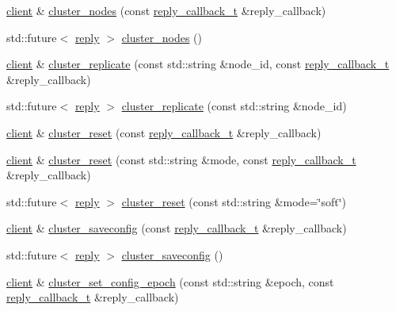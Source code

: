 \begin{DoxyCompactItemize}
\hyperlink{classcpp__redis_1_1client}{client} \& \hyperlink{classcpp__redis_1_1client_a1e4cc880ce249fcad1b1f6ddd15f515f}{cluster\+\_\+nodes} (const \hyperlink{classcpp__redis_1_1client_a061a1140d36d2eaeda82b09a0bb3f9f2}{reply\+\_\+callback\+\_\+t} \&reply\+\_\+callback)
\item 
std\+::future$<$ \hyperlink{classcpp__redis_1_1reply}{reply} $>$ \hyperlink{classcpp__redis_1_1client_a6e777dc7b54ecb4aff3e1c281f92dd81}{cluster\+\_\+nodes} ()
\item 
\hyperlink{classcpp__redis_1_1client}{client} \& \hyperlink{classcpp__redis_1_1client_a65688223390e47c0400ba4a128000f89}{cluster\+\_\+replicate} (const std\+::string \&node\+\_\+id, const \hyperlink{classcpp__redis_1_1client_a061a1140d36d2eaeda82b09a0bb3f9f2}{reply\+\_\+callback\+\_\+t} \&reply\+\_\+callback)
\item 
std\+::future$<$ \hyperlink{classcpp__redis_1_1reply}{reply} $>$ \hyperlink{classcpp__redis_1_1client_a4ce5b739522aefd5ca7c8aef8c76cc61}{cluster\+\_\+replicate} (const std\+::string \&node\+\_\+id)
\item 
\hyperlink{classcpp__redis_1_1client}{client} \& \hyperlink{classcpp__redis_1_1client_a99c86f1931c92594f2c14ac34b3d5dfd}{cluster\+\_\+reset} (const \hyperlink{classcpp__redis_1_1client_a061a1140d36d2eaeda82b09a0bb3f9f2}{reply\+\_\+callback\+\_\+t} \&reply\+\_\+callback)
\item 
\hyperlink{classcpp__redis_1_1client}{client} \& \hyperlink{classcpp__redis_1_1client_a3f039634232d14d4eec6fea27784a347}{cluster\+\_\+reset} (const std\+::string \&mode, const \hyperlink{classcpp__redis_1_1client_a061a1140d36d2eaeda82b09a0bb3f9f2}{reply\+\_\+callback\+\_\+t} \&reply\+\_\+callback)
\item 
std\+::future$<$ \hyperlink{classcpp__redis_1_1reply}{reply} $>$ \hyperlink{classcpp__redis_1_1client_ac49706b4ea17538653a6e5a77791ae31}{cluster\+\_\+reset} (const std\+::string \&mode=\char`\"{}soft\char`\"{})
\item 
\hyperlink{classcpp__redis_1_1client}{client} \& \hyperlink{classcpp__redis_1_1client_a2860dbeb1f7acd44e72e3ad02fc16e20}{cluster\+\_\+saveconfig} (const \hyperlink{classcpp__redis_1_1client_a061a1140d36d2eaeda82b09a0bb3f9f2}{reply\+\_\+callback\+\_\+t} \&reply\+\_\+callback)
\item 
std\+::future$<$ \hyperlink{classcpp__redis_1_1reply}{reply} $>$ \hyperlink{classcpp__redis_1_1client_a5b8571b48e9e56fad203a04dd50559be}{cluster\+\_\+saveconfig} ()
\item 
\hyperlink{classcpp__redis_1_1client}{client} \& \hyperlink{classcpp__redis_1_1client_ac930f6544459b0b2476f741beb6a2508}{cluster\+\_\+set\+\_\+config\+\_\+epoch} (const std\+::string \&epoch, const \hyperlink{classcpp__redis_1_1client_a061a1140d36d2eaeda82b09a0bb3f9f2}{reply\+\_\+callback\+\_\+t} \&reply\+\_\+callback)

\end{DoxyCompactItemize}
